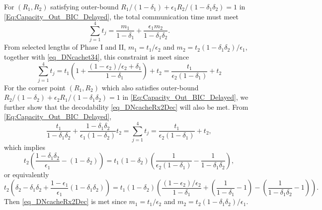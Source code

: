 For $(R_1,R_2)$ satisfying outer-bound $R_1/(1-\delta_1)+\epsilon_1 R_2/(1-\delta_1\delta_2)=1$ in
\eqref{Eq:Capacity_Out_BIC_Delayed}, the total communication time must meet
\[
\sum^4_{j=1} t_j=\frac{m_1}{1-\delta_1}+\frac{\epsilon_1 m_2}{1-\delta_1\delta_2}.
\]
From selected lengths of Phase I and II, $m_1=t_1/\epsilon_2$ and $m_2=t_2(1-\delta_1\delta_2)/\epsilon_1$, together with \eqref{eq_DNcachet34}, this constraint is meet since
\[
\sum^4_{j=1} t_j =t_1 \left(1+\frac{(1-\epsilon_2)/\epsilon_2+\delta_1}{1-\delta_1}\right)+t_2=\frac{t_1}{\epsilon_2(1-\delta_1)}+t_2
\]
For the corner point $(R_1,R_2)$ which also satisfies outer-bound $R_2/(1-\delta_2)+\epsilon_2 R_1/(1-\delta_1\delta_2)=1$ in
\eqref{Eq:Capacity_Out_BIC_Delayed}, we further show that the decodability \eqref{eq_DNcacheRx2Dec} will also be met. From \eqref{Eq:Capacity_Out_BIC_Delayed},
\[
\frac{t_1}{1-\delta_1\delta_2}+\frac{1-\delta_1\delta_2}{\epsilon_1(1-\delta_2)}t_2= \sum^4_{j=1} t_j =\frac{t_1}{\epsilon_2(1-\delta_1)}+t_2,
\]
which implies
\[
t_2 \left( \frac{1-\delta_1\delta_2}{\epsilon_1}-(1-\delta_2)\right)=t_1 (1-\delta_2)\left( \frac{1}{\epsilon_2(1-\delta_1)}- \frac{1}{1-\delta_1\delta_2}\right),
\]
or equivalently
\[
t_2 \left(\delta_2-\delta_1\delta_2+\frac{1-\epsilon_1}{\epsilon_1}(1-\delta_1\delta_2)\right)=t_1 (1-\delta_2)\left( \frac{(1-\epsilon_2)/\epsilon_2}{1-\delta_1}+\left(\frac{1}{1-\delta_1}-1\right)- \left(\frac{1}{1-\delta_1\delta_2}-1\right)\right).
\]
 Then \eqref{eq_DNcacheRx2Dec} is met since $m_1=t_1/\epsilon_2$ and $m_2=t_2(1-\delta_1\delta_2)/\epsilon_1$. 